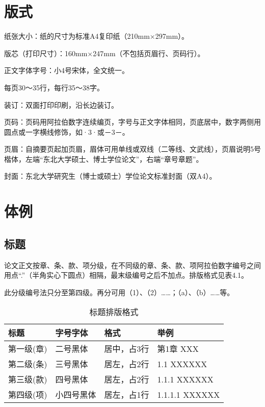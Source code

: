 \section{版式}
纸张大小：纸的尺寸为标准A4复印纸（210mm×297mm）。

版芯（打印尺寸）：160mm×247mm（不包括页眉行、页码行）。

正文字体字号：小4号宋体，全文统一。

每页30～35行，每行35～38字。

装订：双面打印印刷，沿长边装订。

页码：页码用阿拉伯数字连续编页，字号与正文字体相同，页底居中，数字两侧用圆点或一字横线修饰，如·3·或－3－。

页眉：自摘要页起加页眉，眉体可用单线或双线（二等线、文武线），页眉说明5号楷体，左端“东北大学硕士、博士学位论文”，右端“章号章题”。

封面：东北大学研究生（博士或硕士）学位论文标准封面（双A4）。

\section{体例}

\subsection{标题}

论文正文按章、条、款、项分级，在不同级的章、条、款、项阿拉伯数字编号之间用点“.”（半角实心下圆点）相隔，最末级编号之后不加点。排版格式见表4.1。

此分级编号法只分至第四级。再分可用（1）、（2）……；（a）、（b）……等。

\begin{table}[htpb]
    \begin{center}
        \caption{标题排版格式}%
        \begin{tabular}{|l | l | l | l |}
            \hline
            标题       & 字号字体   & 格式        & 举例           \\
            \hline
            第一级(章) & 二号黑体   & 居中，占3行 & 第1章 XXX      \\
            \hline
            第二级(条) & 三号黑体   & 居左，占2行 & 1.1 XXXXXX     \\
            \hline
            第三级(款) & 四号黑体   & 居左，占2行 & 1.1.1 XXXXXX   \\
            \hline
            第四级(项) & 小四号黑体 & 居左，占1行 & 1.1.1.1 XXXXXX \\
            \hline
        \end{tabular}
    \end{center}
\end{table}

